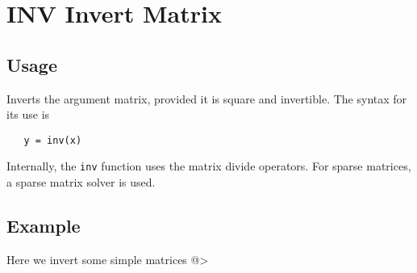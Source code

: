 \section{INV Invert Matrix}

\subsection{Usage}

Inverts the argument matrix, provided it is square and invertible.
The syntax for its use is
\begin{verbatim}
   y = inv(x)
\end{verbatim}
Internally, the \verb|inv| function uses the matrix divide operators.
For sparse matrices, a sparse matrix solver is used.
\subsection{Example}

Here we invert some simple matrices
@>
